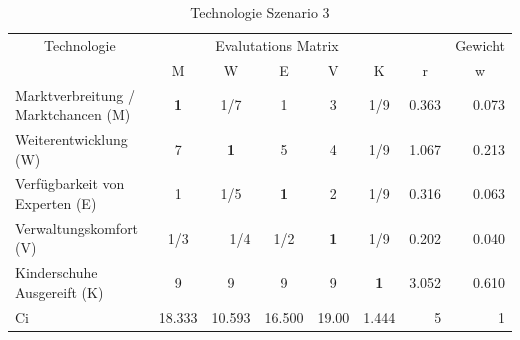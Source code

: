 \begin{table}[htbp]
\caption{Technologie Szenario 3}
\begin{tabular}{|p{3.9cm}|c|c|c|c|c|r|r|}
\hline
\multicolumn{ 1}{|c|}{Technologie} & \multicolumn{ 5}{c|}{Evalutations Matrix} & \multicolumn{1}{l|}{} & \multicolumn{1}{l|}{Gewicht} \\ \cline{ 2- 8}
\multicolumn{ 1}{|c|}{} & M & W & E & V & K & \multicolumn{1}{c|}{r} & \multicolumn{1}{c|}{w} \\ \hline
Marktverbreitung / Marktchancen (M) & \textbf{1} &  1/7 & 1 & 3 &  1/9 & 0.363 & 0.073 \\ \hline
Weiterentwicklung (W) & 7 & \textbf{1} & 5 & 4 &  1/9 & 1.067 & 0.213 \\ \hline
Verfügbarkeit von Experten (E) & 1 &  1/5 & \textbf{1} & 2 &  1/9 & 0.316 & 0.063 \\ \hline
Verwaltungskomfort (V) &  1/3 & \multicolumn{1}{r|}{ 1/4} &  1/2 & \textbf{1} &  1/9 & 0.202 & 0.040 \\ \hline
Kinderschuhe Ausgereift (K) & 9 & 9 & 9 & 9 & \textbf{1} & 3.052 & 0.610 \\ \hline  \hline
Ci & \multicolumn{1}{r|}{18.333} & \multicolumn{1}{r|}{10.593} & \multicolumn{1}{r|}{16.500} & \multicolumn{1}{r|}{19.00} & \multicolumn{1}{r|}{1.444} & 5 & 1 \\ \hline
\end{tabular}
\label{AHPTechnologieS3}
\end{table}

